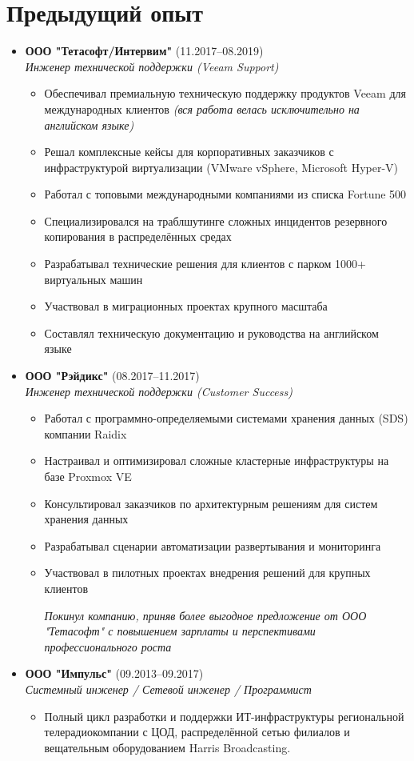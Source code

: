 \documentclass[11pt]{article}
\begin{document}
\section{Предыдущий опыт}
\begin{itemize}
    \item \textbf{ООО "Тетасофт/Интервим"} (11.2017–08.2019) \\
    \textit{Инженер технической поддержки (Veeam Support)}
    \begin{itemize}
        \item Обеспечивал премиальную техническую поддержку продуктов Veeam для международных клиентов \textit{(вся работа велась исключительно на английском языке)}
        \item Решал комплексные кейсы для корпоративных заказчиков с инфраструктурой виртуализации (VMware vSphere, Microsoft Hyper-V)
        \item Работал с топовыми международными компаниями из списка Fortune 500
        \item Специализировался на траблшутинге сложных инцидентов резервного копирования в распределённых средах
        \item Разрабатывал технические решения для клиентов с парком 1000+ виртуальных машин
        \item Участвовал в миграционных проектах крупного масштаба
        \item Составлял техническую документацию и руководства на английском языке
    \end{itemize}
    \item \textbf{ООО "Рэйдикс"} (08.2017–11.2017) \\
    \textit{Инженер технической поддержки (Customer Success)}
    \begin{itemize}
        \item Работал с программно-определяемыми системами хранения данных (SDS) компании Raidix
        \item Настраивал и оптимизировал сложные кластерные инфраструктуры на базе Proxmox VE
        \item Консультировал заказчиков по архитектурным решениям для систем хранения данных
        \item Разрабатывал сценарии автоматизации развертывания и мониторинга
        \item Участвовал в пилотных проектах внедрения решений для крупных клиентов
        
        \textit{Покинул компанию, приняв более выгодное предложение от ООО "Тетасофт" с повышением зарплаты и перспективами профессионального роста}
    \end{itemize}
    \item \textbf{ООО "Импульс"} (09.2013–09.2017) \\
    \textit{Системный инженер / Сетевой инженер / Программист}
    \begin{itemize}
        \item Полный цикл разработки и поддержки ИТ-инфраструктуры региональной телерадиокомпании с ЦОД, распределённой сетью филиалов и вещательным оборудованием Harris Broadcasting.
    

\end{itemize}
\end{itemize}
\end{document}
